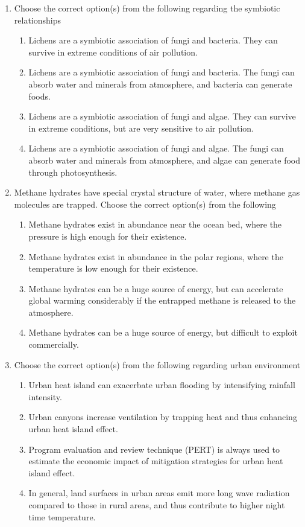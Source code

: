 \documentclass[journal]{IEEEtran}
\begin{document}
\begin{enumerate}[resume]
\item Choose the correct option(s) from the following regarding the symbiotic relationships
\hfill{}
\begin{enumerate}
\item Lichens are a symbiotic association of fungi and bacteria. They can survive in extreme conditions of air pollution.
\item Lichens are a symbiotic association of fungi and bacteria. The fungi can absorb water and minerals from atmosphere, and bacteria can generate foods.
\item Lichens are a symbiotic association of fungi and algae. They can survive in extreme conditions, but are very sensitive to air pollution.
\item Lichens are a symbiotic association of fungi and algae. The fungi can absorb water and minerals from atmosphere, and algae can generate food through photosynthesis.
\end{enumerate}

\item Methane hydrates have special crystal structure of water, where methane gas molecules are trapped. Choose the correct option(s) from the following
\hfill{}
\begin{enumerate}
\item Methane hydrates exist in abundance near the ocean bed, where the pressure is high enough for their existence.
\item Methane hydrates exist in abundance in the polar regions, where the temperature is low enough for their existence.
\item Methane hydrates can be a huge source of energy, but can accelerate global warming considerably if the entrapped methane is released to the atmosphere.
\item Methane hydrates can be a huge source of energy, but difficult to exploit commercially.
\end{enumerate}

\item Choose the correct option(s) from the following regarding urban environment
\hfill{}
\begin{enumerate}
\item Urban heat island can exacerbate urban flooding by intensifying rainfall intensity.
\item Urban canyons increase ventilation by trapping heat and thus enhancing urban heat island effect.
\item Program evaluation and review technique (PERT) is always used to estimate the economic impact of mitigation strategies for urban heat island effect.
\item In general, land surfaces in urban areas emit more long wave radiation compared to those in rural areas, and thus contribute to higher night time temperature.
\end{enumerate}


\end{enumerate}
\end{document}
